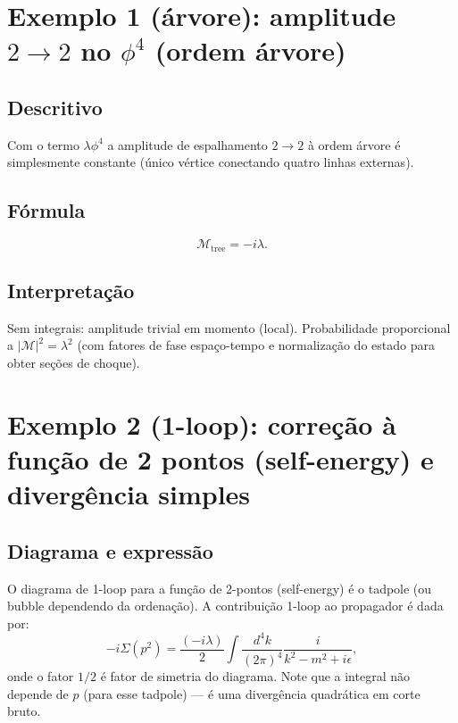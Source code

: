 \documentclass[12pt,a4paper]{article}
\begin{document}
\section{Exemplo 1 (árvore): amplitude \(2\to2\) no \(\phi^4\) (ordem árvore)}
\subsection{Descritivo}
Com o termo \(\lambda\phi^4\) a amplitude de espalhamento \(2\to2\) à ordem árvore é simplesmente constante (único vértice conectando quatro linhas externas).

\subsection{Fórmula}
\begin{equation}\label{amp_tree}
\mathcal{M}_{\text{tree}} = -i\lambda.
\end{equation}

\subsection{Interpretação}
Sem integrais: amplitude trivial em momento (local). Probabilidade proporcional a \(|\mathcal{M}|^2 = \lambda^2\) (com fatores de fase espaço-tempo e normalização do estado para obter seções de choque).

\section{Exemplo 2 (1-loop): correção à função de 2 pontos (self-energy) e divergência simples}
\subsection{Diagrama e expressão}
O diagrama de 1-loop para a função de 2-pontos (self-energy) é o tadpole (ou bubble dependendo da ordenação). A contribuição 1-loop ao propagador é dada por:
\begin{equation}\label{self_raw}
-i \Sigma(p^2) = \frac{(-i\lambda)}{2} \int \frac{d^4k}{(2\pi)^4} \frac{i}{k^2 - m^2 + i\epsilon},
\end{equation}
onde o fator \(1/2\) é fator de simetria do diagrama. Note que a integral não depende de \(p\) (para esse tadpole) — é uma divergência quadrática em corte bruto.
\end{document}
